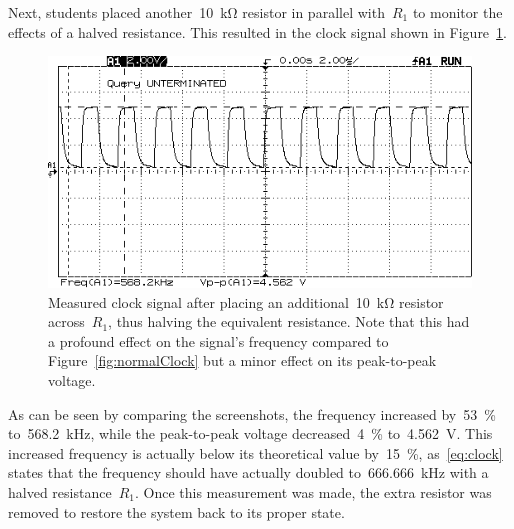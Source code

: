 %
Next, students placed another~\SI{10}{\kilo\ohm} resistor in parallel with~$R_1$ to monitor the effects of a halved resistance.  This resulted in the clock signal shown in Figure~\ref{fig:fastClock}.
%
\begin{figure}[H]
	\centering
	\includegraphics[width=.6\textwidth]{img/shot/part2bshot.png}
	\parbox{.6\textwidth}{
	\caption[Atypical ADC clock signal]{Measured clock signal after placing an additional~\SI{10}{\kilo\ohm} resistor across~$R_1$, thus halving the equivalent resistance.  Note that this had a profound effect on the signal's frequency compared to Figure~\ref{fig:normalClock} but a minor effect on its peak-to-peak voltage.}
	\label{fig:fastClock}}
\end{figure}
%
As can be seen by comparing the screenshots, the frequency increased by~\SI{53}{\percent} to~\SI{568.2}{\kilo\hertz}, while the peak-to-peak voltage decreased~\SI{4}{\percent} to~\SI{4.562}{\volt}.  This increased frequency is actually below its theoretical value by~\SI{15}{\percent}, as~\eqref{eq:clock} states that the frequency should have actually doubled to~\SI{666.666}{\kilo\hertz} with a halved resistance~$R_1$.  Once this measurement was made, the extra resistor was removed to restore the system back to its proper state.


\begin{figure}[H]
	\centering
	
\end{figure}

\begin{figure}[H]
	\centering
	
\end{figure}

\begin{figure}[H]
	\centering
	
\end{figure}
